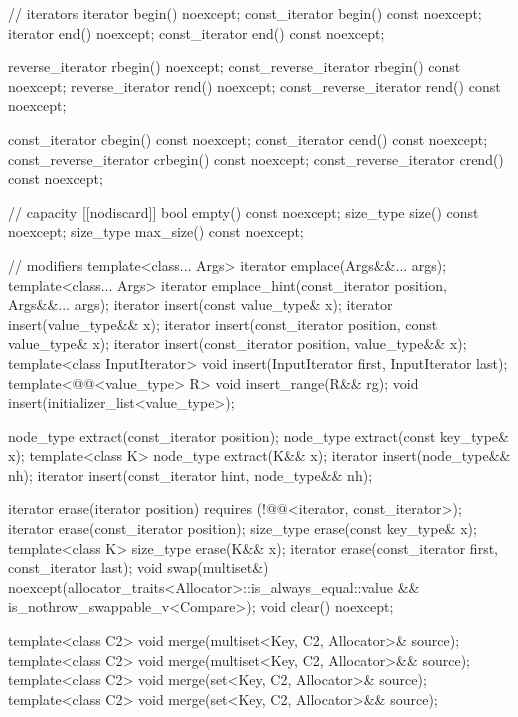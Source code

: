 \begin{codeblock}
{{    // iterators
    iterator               begin() noexcept;
    const_iterator         begin() const noexcept;
    iterator               end() noexcept;
    const_iterator         end() const noexcept;

    reverse_iterator       rbegin() noexcept;
    const_reverse_iterator rbegin() const noexcept;
    reverse_iterator       rend() noexcept;
    const_reverse_iterator rend() const noexcept;

    const_iterator         cbegin() const noexcept;
    const_iterator         cend() const noexcept;
    const_reverse_iterator crbegin() const noexcept;
    const_reverse_iterator crend() const noexcept;

    // capacity
    [[nodiscard]] bool empty() const noexcept;
    size_type size() const noexcept;
    size_type max_size() const noexcept;

    // modifiers
    template<class... Args> iterator emplace(Args&&... args);
    template<class... Args> iterator emplace_hint(const_iterator position, Args&&... args);
    iterator insert(const value_type& x);
    iterator insert(value_type&& x);
    iterator insert(const_iterator position, const value_type& x);
    iterator insert(const_iterator position, value_type&& x);
    template<class InputIterator>
      void insert(InputIterator first, InputIterator last);
    template<@@<value_type> R>
      void insert_range(R&& rg);
    void insert(initializer_list<value_type>);

    node_type extract(const_iterator position);
    node_type extract(const key_type& x);
    template<class K> node_type extract(K&& x);
    iterator insert(node_type&& nh);
    iterator insert(const_iterator hint, node_type&& nh);

    iterator  erase(iterator position)
      requires (!@@<iterator, const_iterator>);
    iterator  erase(const_iterator position);
    size_type erase(const key_type& x);
    template<class K> size_type erase(K&& x);
    iterator  erase(const_iterator first, const_iterator last);
    void      swap(multiset&)
      noexcept(allocator_traits<Allocator>::is_always_equal::value &&
               is_nothrow_swappable_v<Compare>);
    void      clear() noexcept;

    template<class C2>
      void merge(multiset<Key, C2, Allocator>& source);
    template<class C2>
      void merge(multiset<Key, C2, Allocator>&& source);
    template<class C2>
      void merge(set<Key, C2, Allocator>& source);
    template<class C2>
      void merge(set<Key, C2, Allocator>&& source);

}}
\end{codeblock}

